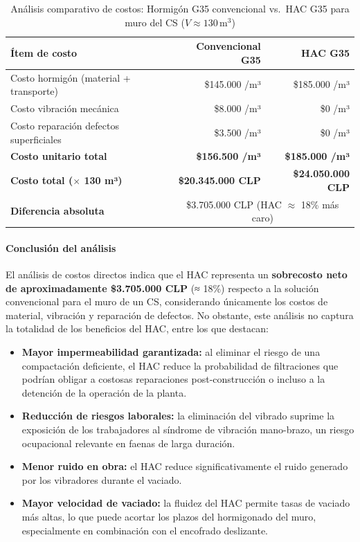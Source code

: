 \begin{table}[H]
  \centering
  \caption{Análisis comparativo de costos: Hormigón G35 convencional vs.\ HAC G35 para muro del CS ($V \approx 130\,\text{m}^3$)}
  \label{tab:costos}
  \begin{tabular}{p{5.5cm} r r}
    \toprule
    \textbf{Ítem de costo}                          & \textbf{Convencional G35}  & \textbf{HAC G35} \\
    \midrule
    Costo hormigón (material + transporte)          & \$145.000 /m³              & \$185.000 /m³    \\
    Costo vibración mecánica                        & \$8.000 /m³                & \$0 /m³          \\
    Costo reparación defectos superficiales         & \$3.500 /m³                & \$0 /m³          \\
    \midrule
    \textbf{Costo unitario total}                   & \textbf{\$156.500 /m³}     & \textbf{\$185.000 /m³} \\
    \textbf{Costo total ($\times$ 130 m³)}          & \textbf{\$20.345.000 CLP}  & \textbf{\$24.050.000 CLP} \\
    \midrule
    \textbf{Diferencia absoluta}                    & \multicolumn{2}{c}{\$3.705.000 CLP (HAC $\approx$ 18\% más caro)} \\
    \bottomrule
  \end{tabular}
\end{table}

\paragraph{Conclusión del análisis}

El análisis de costos directos indica que el HAC representa un \textbf{sobrecosto neto de aproximadamente \$3.705.000 CLP} (≈ 18\%) respecto a la solución convencional para el muro de un CS, considerando únicamente los costos de material, vibración y reparación de defectos. No obstante, este análisis no captura la totalidad de los beneficios del HAC, entre los que destacan:

\begin{itemize}
    \item \textbf{Mayor impermeabilidad garantizada:} al eliminar el riesgo de una compactación deficiente, el HAC reduce la probabilidad de filtraciones que podrían obligar a costosas reparaciones post-construcción o incluso a la detención de la operación de la planta.
    \item \textbf{Reducción de riesgos laborales:} la eliminación del vibrado suprime la exposición de los trabajadores al síndrome de vibración mano-brazo, un riesgo ocupacional relevante en faenas de larga duración.
    \item \textbf{Menor ruido en obra:} el HAC reduce significativamente el ruido generado por los vibradores durante el vaciado.
    \item \textbf{Mayor velocidad de vaciado:} la fluidez del HAC permite tasas de vaciado más altas, lo que puede acortar los plazos del hormigonado del muro, especialmente en combinación con el encofrado deslizante.
\end{itemize}

